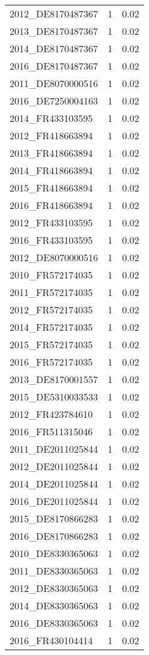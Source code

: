 \begin{table*}[htbp]
\begin{tabular}{lrr}
2012_DE8170487367 & 1 & 0.02 \\
2013_DE8170487367 & 1 & 0.02 \\
2014_DE8170487367 & 1 & 0.02 \\
2016_DE8170487367 & 1 & 0.02 \\
2011_DE8070000516 & 1 & 0.02 \\
2016_DE7250004163 & 1 & 0.02 \\
2014_FR433103595 & 1 & 0.02 \\
2012_FR418663894 & 1 & 0.02 \\
2013_FR418663894 & 1 & 0.02 \\
2014_FR418663894 & 1 & 0.02 \\
2015_FR418663894 & 1 & 0.02 \\
2016_FR418663894 & 1 & 0.02 \\
2012_FR433103595 & 1 & 0.02 \\
2016_FR433103595 & 1 & 0.02 \\
2012_DE8070000516 & 1 & 0.02 \\
2010_FR572174035 & 1 & 0.02 \\
2011_FR572174035 & 1 & 0.02 \\
2012_FR572174035 & 1 & 0.02 \\
2014_FR572174035 & 1 & 0.02 \\
2015_FR572174035 & 1 & 0.02 \\
2016_FR572174035 & 1 & 0.02 \\
2013_DE8170001557 & 1 & 0.02 \\
2015_DE5310033533 & 1 & 0.02 \\
2012_FR423784610 & 1 & 0.02 \\
2016_FR511315046 & 1 & 0.02 \\
2011_DE2011025844 & 1 & 0.02 \\
2012_DE2011025844 & 1 & 0.02 \\
2014_DE2011025844 & 1 & 0.02 \\
2016_DE2011025844 & 1 & 0.02 \\
2015_DE8170866283 & 1 & 0.02 \\
2016_DE8170866283 & 1 & 0.02 \\
2010_DE8330365063 & 1 & 0.02 \\
2011_DE8330365063 & 1 & 0.02 \\
2012_DE8330365063 & 1 & 0.02 \\
2014_DE8330365063 & 1 & 0.02 \\
2016_DE8330365063 & 1 & 0.02 \\
2016_FR430104414 & 1 & 0.02 \\

\end{tabular}
\end{table*}
